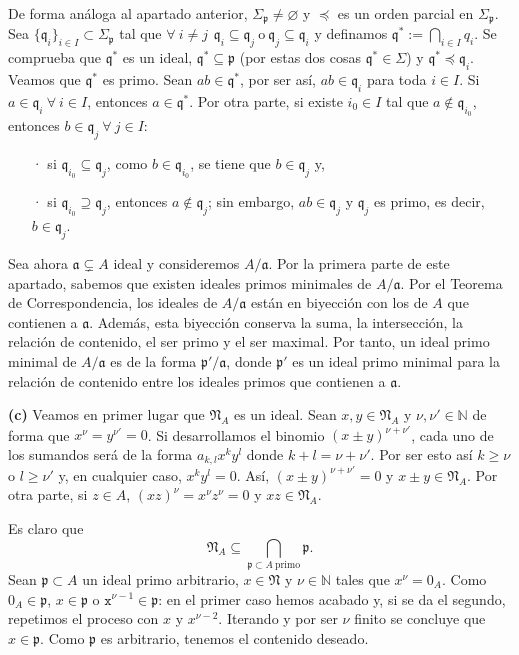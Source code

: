 \documentclass[a4paper,12pt]{article}
\newcommand{\N}{\mathbb{N}}
\newcommand{\x}{\texttt{x}}
\newcommand{\p}{\mathfrak{p}}
\newcommand{\q}{\mathfrak{q}}
\newcommand{\af}{\mathfrak{a}}
\newcommand{\Nf}{\mathfrak{N}}
\theoremstyle{definition}
\begin{document}
De forma análoga al apartado anterior, $\Sigma_{\p}\neq\varnothing$ y $\preceq$ es un orden parcial en $\Sigma_{\p}$. Sea $\{\q_i\}_{i\in I}\subset\Sigma_{\p}$ tal que $\forall\ i\neq j\hspace{5pt}\q_i\subseteq\q_j\ \text{o}\ \q_j\subseteq\q_i$ y definamos $\q^*:=\bigcap_{i\in I}q_i$. 
Se comprueba que $\q^*$ es un ideal, $\q^*\subseteq\p$ (por estas dos cosas $\q^*\in\Sigma$) y $\q^*\preceq\q_i$. 
Veamos que $\q^*$ es primo. Sean $ab\in\q^*$, por ser así, $ab\in\q_i$ para toda $i\in I$. Si $a\in\q_i\ \forall\ i\in I$, entonces $a\in\q^*$. Por otra parte, si existe $i_0\in I$ tal que $a\notin\q_{i_0}$, entonces $b\in\q_j\ \forall\ j\in I$:\begin{itemize}
    \item[·] si $\q_{i_0}\subseteq\q_j$, como $b\in\q_{i_0}$, se tiene que $b\in\q_j$ y,
    \item[·] si $\q_{i_0}\supseteq\q_j$, entonces $a\notin\q_j$; sin embargo, $ab\in\q_j$ y $\q_j$ es primo, es decir, $b\in\q_j$.
\end{itemize}
Sea ahora $\af\subsetneq A$ ideal y consideremos $A/\af$. Por la primera parte de este apartado, sabemos que existen ideales primos minimales de $A/\af$.
Por el Teorema de Correspondencia, los ideales de $A/\af$ están en biyección con los de $A$ que contienen a $\af$.
Además, esta biyección conserva la suma, la intersección, la relación de contenido, el ser primo y el ser maximal. 
Por tanto, un ideal primo minimal de $A/\af$ es de la forma $\p'/\af$, donde $\p'$ es un ideal primo minimal para la relación de contenido entre los ideales primos que contienen a $\af$.

\textbf{(c)} Veamos en primer lugar que $\Nf_A$ es un ideal. Sean $x,y\in\Nf_A$ y $\nu,\nu'\in\N$ de forma que $x^\nu=y^{\nu'}=0$. Si desarrollamos el binomio $(x\pm y)^{\nu+\nu'}$, cada uno de los sumandos será de la forma $a_{k,l}x^ky^l$ donde $k+l=\nu+\nu'$. Por ser esto así $k\geq\nu$ o $l\geq\nu'$ y, en cualquier caso, $x^ky^l=0$. Así, $(x\pm y)^{\nu+\nu'}=0$ y $x\pm y\in\Nf_A$. Por otra parte, si $z\in A$, $(xz)^\nu=x^\nu z^\nu=0$ y $xz\in\Nf_A$.

Es claro que $$\Nf_A\subseteq\underset{\p\subset A\ \text{primo}}{\bigcap}\p.$$ Sean $\p\subset A$ un ideal primo arbitrario, $x\in\Nf$ y $\nu\in\N$ tales que $x^\nu=0_A$. Como $0_A\in\p$, $x\in\p$ o $\x^{\nu-1}\in\p$: en el primer caso hemos acabado y, si se da el segundo, repetimos el proceso con $x$ y $x^{\nu-2}$. Iterando y por ser $\nu$ finito se concluye que $x\in\p$. Como $\p$ es arbitrario, tenemos el contenido deseado.
\end{document}
